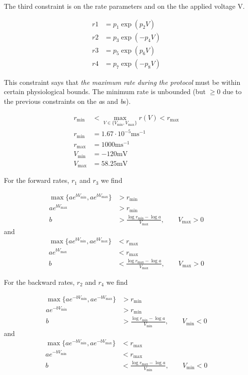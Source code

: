 \documentclass[preprint,authoryear,10pt]{elsarticle}
\begin{document}
The third constraint is on the rate parameters and on the the applied voltage
 V.

\begin{align*}
r1 &= p_1 \exp(p_2 V) \\
r2 &= p_3 \exp(-p_4 V) \\
r3 &= p_5 \exp(p_6 V) \\
r4 &= p_7 \exp(-p_8 V)
\end{align*}

This constraint says that \emph{the maximum rate during the protocol} must
 be within certain physiological bounds.
The minimum rate is unbounded (but $\geq 0$ due to the previous constraints on
 the \emph{a}s and \emph{b}s).

\begin{align*}
r_\text{min} &< \max_{V \in \{V_\text{min}, V_\text{max}\}} r(V) < r_\text{max} \\
r_\text{min} &= 1.67 \cdot 10^{-5} \text{ms}^{-1} \\
r_\text{max} &= 1000 \text{ms}^{-1} \\
V_\text{min} &= -120 \text{mV} \\
V_\text{max} &= 58.25 \text{mV}
\end{align*}


For the forward rates, $r_1$ and $r_3$ we find

\begin{align}
\max\{ a e^{b V_\text{min}}, a e^{b V_\text{max}} \} &> r_\text{min} \\
a e^{b V_\text{max}} &> r_\text{min} \\
b &> \frac{\log r_\text{min} - \log a}{V_\text{max}}, \qquad V_\text{max} > 0
\end{align}
and
\begin{align}
\max\{ a e^{b V_\text{min}}, a e^{b V_\text{max}} \} &< r_\text{max} \\
a e^{b V_\text{max}} &< r_\text{max} \\
b &< \frac{\log r_\text{max} - \log a}{V_\text{max}}, \qquad V_\text{max} > 0
\end{align}

For the backward rates, $r_2$ and $r_4$ we find

\begin{align}
\max\{ a e^{-b V_\text{min}}, a e^{-b V_\text{max}} \} &> r_\text{min} \\
a e^{-b V_\text{min}} &> r_\text{min} \\
b &> \frac{\log r_\text{min} - \log a}{V_\text{min}}, \qquad V_\text{min} < 0
\end{align}
and
\begin{align}
\max\{ a e^{-b V_\text{min}}, a e^{-b V_\text{max}} \} &< r_\text{max} \\
a e^{-b V_\text{min}} &< r_\text{max} \\
b &< \frac{\log r_\text{max} - \log a}{V_\text{min}}, \qquad V_\text{min} < 0
\end{align}
\end{document}
